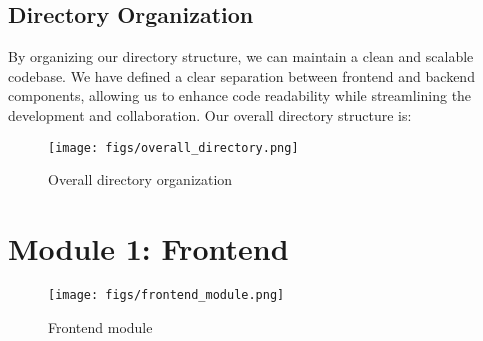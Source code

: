 \documentclass[conference]{IEEEtran}
\begin{document}
\subsection{Directory Organization}
By organizing our directory structure, we can maintain a clean and scalable codebase. We have defined a clear separation between frontend and backend components, allowing us to enhance code readability while streamlining the development and collaboration. Our overall directory structure is:
    \begin{figure}[H]
    \centering
    \texttt{[image: figs/overall\_directory.png]}
    \caption{Overall directory organization}
    \label{fig:Overall directory organization}
    \end{figure}
\section*{Module 1: Frontend}
    \begin{figure}[H]
    \centering
    \texttt{[image: figs/frontend\_module.png]}
    \caption{Frontend module}
    \label{fig:Frontend module}
    \end{figure}
    
\end{document}
